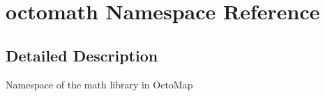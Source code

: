 \hypertarget{namespaceoctomath}{\section{octomath Namespace Reference}
\label{namespaceoctomath}
}


\subsection{Detailed Description}
Namespace of the math library in Octo\+Map 